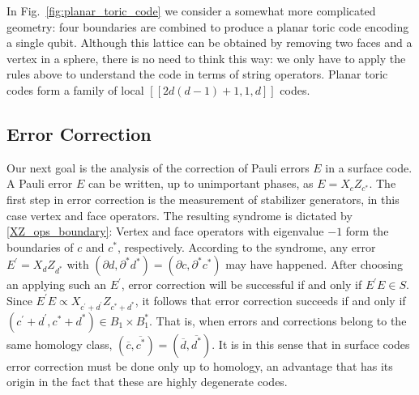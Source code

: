 \documentclass{article}
\newcommand{\prima}{^\prime}
\newcommand{\dual}[1]{{#1}^{\ast}}
\begin{document}
In Fig.~\ref{fig:planar_toric_code} we consider a somewhat more complicated geometry: four boundaries are combined to produce a planar toric code encoding a single qubit. Although this lattice can be obtained by removing two faces and a vertex in a sphere, there is no need to think this way: we only have to apply the rules above to understand the code in terms of string operators. Planar toric codes form a family of local $[[2d(d-1)+1,1,d]]$ codes.


\subsection{Error Correction}\label{sec:error_correction}

Our next goal is the analysis of the correction of Pauli errors $E$ in a surface code. A Pauli error $E$ can be written, up to unimportant phases, as $E=X_{c}Z_{\dual c}$. The first step in error correction is the measurement of stabilizer generators, in this case vertex and face operators. The resulting syndrome is dictated by \eqref{XZ_ops_boundary}: Vertex and face operators with eigenvalue $-1$ form the boundaries of $c$ and $\dual c$, respectively. According to the syndrome, any error $E\prima=X_{d}Z_{\dual d}$ with $(\partial d, \dual\partial {\dual d} )=( \partial c,\dual\partial {\dual c})$ may have happened. After choosing an applying such an $E\prima$, error correction will be successful if and only if $E\prima E\in S$. Since $E\prima E\propto X_{c\prima+d\prima}Z_{\dual c+\dual d}$, it follows that error correction succeeds if and only if $({c\prima+d\prima},{\dual c+\dual d})\in B_1\times \dual B_1$. That is, when errors and corrections belong to the same homology class, $(\overline c,\overline{\dual c})=(\overline d,\overline{\dual d})$. It is in this sense that in surface codes error correction must be done only up to homology, an advantage that has its origin in the fact that these are highly degenerate codes.
\end{document}
